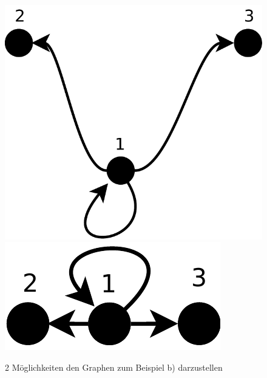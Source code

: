 \begin{figure}
\centering
 \includegraphics[scale=0.4]{./bilder/multigraph_bsp_b1.pdf}
 \includegraphics[scale=0.4]{./bilder/multigraph_bsp_b2.pdf}
 \caption{2 Möglichkeiten den Graphen zum Beispiel b) darzustellen}
\end{figure}

